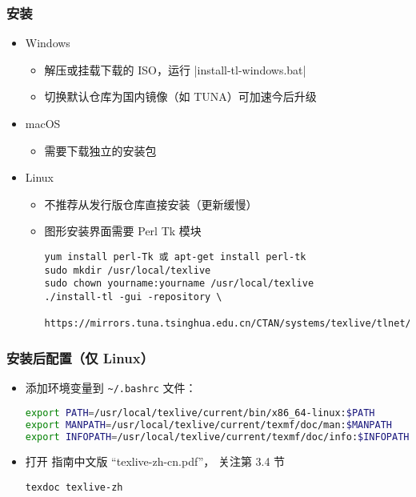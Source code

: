 \begin{frame}[fragile]
  \frametitle{安装}
  \begin{itemize}
    \item Windows
      \begin{itemize}
        \item 解压或挂载下载的 ISO，运行 |install-tl-windows.bat|
        \item 切换默认仓库为国内镜像（如 TUNA）可加速今后升级
      \end{itemize}
    \item macOS
      \begin{itemize}
        \item 需要下载独立的安装包 
      \end{itemize}
    \item Linux
      \begin{itemize}
        \item 不推荐从发行版仓库直接安装（更新缓慢）
        \item 图形安装界面需要 Perl Tk 模块
          \begin{lstlisting}
yum install perl-Tk 或 apt-get install perl-tk
sudo mkdir /usr/local/texlive
sudo chown yourname:yourname /usr/local/texlive
./install-tl -gui -repository \
  https://mirrors.tuna.tsinghua.edu.cn/CTAN/systems/texlive/tlnet/
        \end{lstlisting}
      \end{itemize}
\end{itemize}
\end{frame}

\begin{frame}[fragile]
  \frametitle{安装后配置（仅 Linux）}
  \begin{itemize}
    \item
      添加环境变量到 \nolinkurl{~/.bashrc} 文件：
      \begin{lstlisting}[language=bash]
export PATH=/usr/local/texlive/current/bin/x86_64-linux:$PATH
export MANPATH=/usr/local/texlive/current/texmf/doc/man:$MANPATH
export INFOPATH=/usr/local/texlive/current/texmf/doc/info:$INFOPATH
      \end{lstlisting}
  \item
    打开 \TeXLive 指南中文版 “texlive-zh-cn.pdf”，
    关注第 3.4 节
      \begin{lstlisting}[basicstyle=\ttfamily]
texdoc texlive-zh
      \end{lstlisting}
  \end{itemize}
\end{frame}

